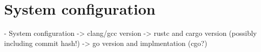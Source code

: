 \chapter{System configuration}
\label{ap:Configuration}











- System configuration
	-> clang/gcc version
	-> rustc and cargo version (possibly including commit hash!)
	-> go version and implmentation (cgo?)
